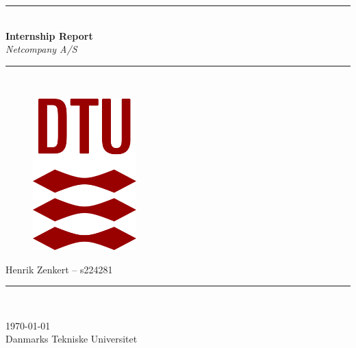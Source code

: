 \documentclass[../main.tex]{subfiles}
\begin{document}
\begin{titlepage}
	\centering
	\rule{\textwidth}{1mm}\\
	\vspace{0.1cm}
	\Huge{}\textbf{Internship Report}\\
	\LARGE{}\emph{Netcompany A/S}

	\vspace{-0.4cm}
	\rule{\textwidth}{1mm}\\
	\vspace{1.3 cm}

	\begin{figure}[H]
		\centering
    \includegraphics[width=4cm]{images/DTULogo.png}
	\end{figure}

	\vspace{1.7cm}
	\mdseries
	\LARGE{  
    Henrik Zenkert                  -- s224281\\
    }
	\vspace{0.2cm}
	\rule{4cm}{0.5mm}\\
	\vspace{0.2cm}

	\large

	\today \\
	Danmarks Tekniske Universitet\\

\end{titlepage}
\end{document}
